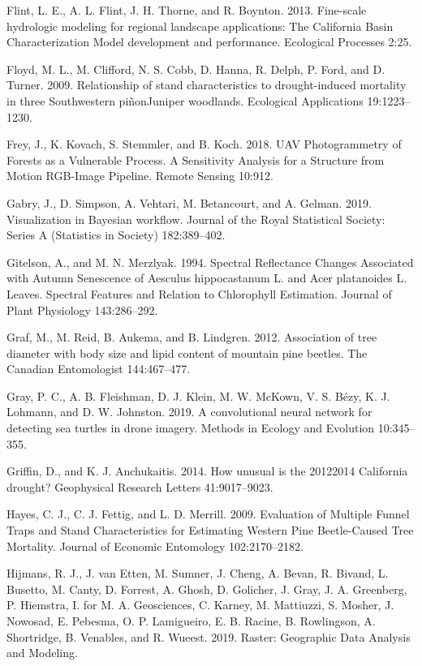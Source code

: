 \documentclass[]{article}
\begin{document}
\hypertarget{ref-flint2013}{}
Flint, L. E., A. L. Flint, J. H. Thorne, and R. Boynton. 2013.
Fine-scale hydrologic modeling for regional landscape applications: The
California Basin Characterization Model development and performance.
Ecological Processes 2:25.

\hypertarget{ref-floyd2009}{}
Floyd, M. L., M. Clifford, N. S. Cobb, D. Hanna, R. Delph, P. Ford, and
D. Turner. 2009. Relationship of stand characteristics to
drought-induced mortality in three Southwestern piñonJuniper woodlands.
Ecological Applications 19:1223--1230.

\hypertarget{ref-frey2018}{}
Frey, J., K. Kovach, S. Stemmler, and B. Koch. 2018. UAV Photogrammetry
of Forests as a Vulnerable Process. A Sensitivity Analysis for a
Structure from Motion RGB-Image Pipeline. Remote Sensing 10:912.

\hypertarget{ref-gabry2019}{}
Gabry, J., D. Simpson, A. Vehtari, M. Betancourt, and A. Gelman. 2019.
Visualization in Bayesian workflow. Journal of the Royal Statistical
Society: Series A (Statistics in Society) 182:389--402.

\hypertarget{ref-gitelson1994}{}
Gitelson, A., and M. N. Merzlyak. 1994. Spectral Reflectance Changes
Associated with Autumn Senescence of Aesculus hippocastanum L. and Acer
platanoides L. Leaves. Spectral Features and Relation to Chlorophyll
Estimation. Journal of Plant Physiology 143:286--292.

\hypertarget{ref-graf2012}{}
Graf, M., M. Reid, B. Aukema, and B. Lindgren. 2012. Association of tree
diameter with body size and lipid content of mountain pine beetles. The
Canadian Entomologist 144:467--477.

\hypertarget{ref-gray2019}{}
Gray, P. C., A. B. Fleishman, D. J. Klein, M. W. McKown, V. S. Bézy, K.
J. Lohmann, and D. W. Johnston. 2019. A convolutional neural network for
detecting sea turtles in drone imagery. Methods in Ecology and Evolution
10:345--355.

\hypertarget{ref-griffin2014}{}
Griffin, D., and K. J. Anchukaitis. 2014. How unusual is the 20122014
California drought? Geophysical Research Letters 41:9017--9023.

\hypertarget{ref-hayes2009}{}
Hayes, C. J., C. J. Fettig, and L. D. Merrill. 2009. Evaluation of
Multiple Funnel Traps and Stand Characteristics for Estimating Western
Pine Beetle-Caused Tree Mortality. Journal of Economic Entomology
102:2170--2182.

\hypertarget{ref-hijmans2019}{}
Hijmans, R. J., J. van Etten, M. Sumner, J. Cheng, A. Bevan, R. Bivand,
L. Busetto, M. Canty, D. Forrest, A. Ghosh, D. Golicher, J. Gray, J. A.
Greenberg, P. Hiemstra, I. for M. A. Geosciences, C. Karney, M.
Mattiuzzi, S. Mosher, J. Nowosad, E. Pebesma, O. P. Lamigueiro, E. B.
Racine, B. Rowlingson, A. Shortridge, B. Venables, and R. Wueest. 2019.
Raster: Geographic Data Analysis and Modeling.
\end{document}
